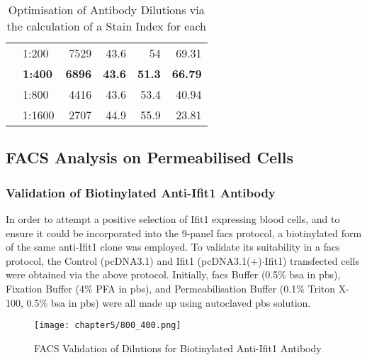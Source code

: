 \begin{sidewaystable}[!htbp]
\begin{tabular}{llrrrr}
                       & 1:200    & 7529                                    & 43.6                                    & 54                                         & 69.31          \\
                       & \textbf{1:400}    & \textbf{6896}                                    & \textbf{43.6}                                    & \textbf{51.3}                                       & \textbf{66.79}          \\
                       & 1:800    & 4416                                    & 43.6                                    & 53.4                                       & 40.94          \\
                       & 1:1600   & 2707                                    & 44.9                                    & 55.9                                       & 23.81         
\end{tabular}
\caption{Optimisation of Antibody Dilutions via the calculation of a Stain Index for each}
\label{tab:MFI_Optimisation}
\end{sidewaystable}


\subsection{FACS Analysis on Permeabilised Cells}

\subsubsection{Validation of Biotinylated Anti-Ifit1 Antibody} \label{ValidationBiotinylatedAnti-Ifit1}

In order to attempt a positive selection of Ifit1 expressing blood cells, and to ensure it could be incorporated into the 9-panel \acrshort{facs} protocol, a biotinylated form of the same anti-Ifit1 clone was employed. To validate its suitability in a \acrshort{facs} protocol, the Control (pcDNA3.1) and Ifit1 (pcDNA3.1($+$)$\cdot$Ifit1) transfected cells were obtained via the above protocol. Initially, \acrshort{facs} Buffer (0.5\% \acrshort{bsa} in \acrshort{pbs}), Fixation Buffer (4\% PFA in \acrshort{pbs}), and Permeabilisation Buffer (0.1\% Triton X-100, 0.5\% \acrshort{bsa} in \acrshort{pbs}) were all made up using autoclaved \acrshort{pbs} solution. 

\begin{figure*}[!htbp]
\centering
\texttt{[image: chapter5/800\_400.png]}
\caption[FACS Validation of Anti-Ifit1 Dilutions (1:800 \& 1:400)]{FACS Validation of Dilutions for Biotinylated Anti-Ifit1 Antibody}
\label{fig:FACS_Biotin_Ifit1_Validation}
\end{figure*}

